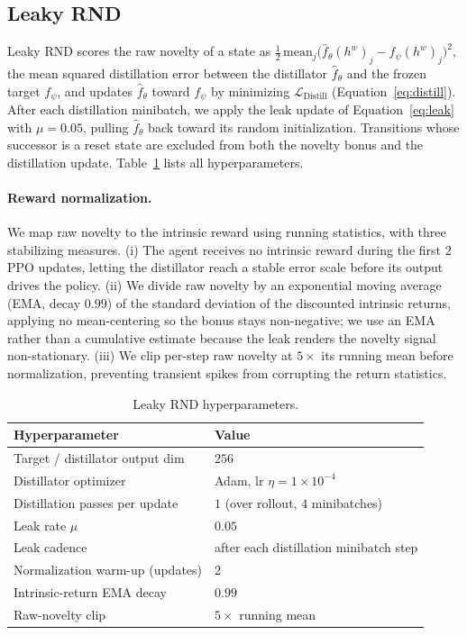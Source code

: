 \documentclass{article}
\begin{document}
\subsection{Leaky RND}
\label{app:leakyrnd}
Leaky RND scores the raw novelty of a state as
$\tfrac{1}{2}\,\text{mean}_j\big(\hat f_\theta(h^w)_j - f_\psi(h^w)_j\big)^2$, the
mean squared distillation error between the distillator $\hat f_\theta$ and the
frozen target $f_\psi$, and updates $\hat f_\theta$ toward $f_\psi$ by minimizing
$\mathcal{L}_{\text{Distill}}$ (Equation~\ref{eq:distill}). After each
distillation minibatch, we apply the leak update of Equation~\eqref{eq:leak} with
$\mu = 0.05$, pulling $\hat f_\theta$ back toward its random initialization.
Transitions whose successor is a reset state are excluded from both the novelty
bonus and the distillation update. Table~\ref{tab:leaky} lists all
hyperparameters.

\paragraph{Reward normalization.} We map raw novelty to the intrinsic reward
using running statistics, with three stabilizing measures. (i) The agent
receives no intrinsic reward during the first $2$ PPO updates, letting the
distillator reach a stable error scale before its output drives the policy.
(ii) We divide raw novelty by an exponential moving average (EMA, decay $0.99$)
of the standard deviation of the discounted intrinsic returns, applying no
mean-centering so the bonus stays non-negative; we use an EMA rather than a
cumulative estimate because the leak renders the novelty signal non-stationary.
(iii) We clip per-step raw novelty at $5\times$ its running mean before
normalization, preventing transient spikes from corrupting the return
statistics.

\begin{table}[h]
\centering
\caption{Leaky RND hyperparameters.}
\label{tab:leaky}
\begin{tabular}{ll}
\toprule
Hyperparameter & Value \\
\midrule
Target / distillator output dim & $256$ \\
Distillator optimizer & Adam, lr $\eta = 1\times10^{-4}$ \\
Distillation passes per update & $1$ (over rollout, $4$ minibatches) \\
Leak rate $\mu$ & $0.05$ \\
Leak cadence & after each distillation minibatch step \\
Normalization warm-up (updates) & $2$ \\
Intrinsic-return EMA decay & $0.99$ \\
Raw-novelty clip & $5\times$ running mean \\
\bottomrule
\end{tabular}
\end{table}
\end{document}
